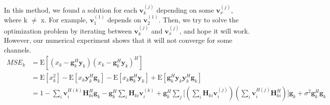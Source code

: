 \documentclass[11pt, oneside]{article}   	%
\begin{document}
In this method, we found a solution for each $\textbf{v}_{k}^{(j)}$ depending on some $\textbf{v}_{x}^{(j)}$, where k $\neq$ x. For example, $\textbf{v}_{1}^{(1)}$ depends on $\textbf{v}_{2}^{(1)}$. Then, we try to solve the optimization problem by iterating between $\textbf{v}_{k}^{(j)}$ and $\textbf{v}_{x}^{(j)}$, and hope it will work. However, our numerical experiment shows that it will not converge for some channels.
\begin{align*}
MSE_{k} &= \mathrm{E}	[	(	x_k-\textbf{g}^{H}_{k}	\textbf{y}_{k}	)(x_k-\textbf{g}^{H}_{k}	\textbf{y}_{k})^{H}	] \\
		       & = \mathrm{E}[x_k^{2}]	 - \mathrm{E}[x_k	\textbf{y}_{k}^{H} \textbf{g}_{k}]	
		       					-  \mathrm{E}[x_k	\textbf{g}_{k}^{H} \textbf{y}_{k}]
							+ \mathrm{E}[\textbf{g}_{k}^{H} \textbf{y}_{k}	\textbf{y}_{k}^{H} \textbf{g}_{k}]			\\
		       & = 1 - \displaystyle\sum_{i}	\textbf{v}^{H(k)}_{i}	\textbf{H}^{H}_{ki}	\textbf{g}_{k}
		       		- \textbf{g}^{H}_{k}		\displaystyle\sum_{i}	\textbf{H}_{ki}	\textbf{v}^{(k)}_{i}
				+\textbf{g}^{H}_{k}		\displaystyle\sum_{j}
									\bigg[	(\displaystyle\sum_{i}\textbf{H}_{ki}\textbf{v}^{(j)}_{i})
									(\displaystyle\sum_{i}\textbf{v}^{H(j)}_{i}\textbf{H}^{H}_{ki})	\bigg]	\textbf{g}_{k}
				+\sigma^2		\textbf{g}^{H}_{k}	 \textbf{g}_{k}
\end{align*}
\end{document}

